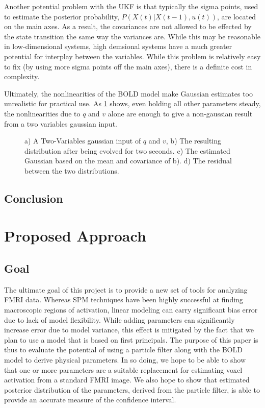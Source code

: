 \documentclass{article}
\begin{document}
Another potential problem with the UKF is that typically the sigma points,
used to estimate the posterior probability, $P(X(t) | X(t-1), u(t))$, are
located on the main axes. As a result, the covariances are not allowed to 
be effected by the state transition the same way the variances are. While
this may be reasonable in low-dimensional systems, high demsional systems
have a much greater potential for interplay between the variables. While
this problem is relatively easy to fix (by using more sigma points off
the main axes), there is a definite cost in complexity.

Ultimately, the nonlinearities of the BOLD model make Gaussian estimates
too unrealistic for practical use. As \ref{fig:Transformation} shows, even 
holding all other parameters steady, the nonlinearities due to $q$ and $v$
alone are enough to give a non-gaussian result from a two variables 
gaussian input. 

\begin{figure}

\label{fig:Transformation}
\caption{a) A Two-Variables gaussian input of $q$ and $v$, b) The 
resulting distribution after being evolved for two seconds. c) The
estimated Gaussian based on the mean and covariance of b). d) The
residual between the two distributions.}
\end{figure}

\subsection{Conclusion}

\section{Proposed Approach}
\subsection{Goal}
The ultimate goal of this project is to provide a new set of tools
for analyzing FMRI data. Whereas SPM techniques have been highly 
successful at finding macroscopic regions of activation, linear 
modeling can carry significant bias error due to lack of model
flexibility. While adding parameters can significantly increase
error due to model variance, this effect is mitigated by the fact
that we plan to use a model that is based on first principals. The
purpose of this paper is thus to evaluate the potential of using
a particle filter along with the BOLD model to derive physical 
parameters. In so doing, we hope to be able to show that one or more
parameters are a suitable replacement for estimating voxel 
activation from a standard FMRI image. We also hope to show that 
estimated posterior distribution of the parameters, derived from
the particle filter, is able to provide an accurate measure of the
confidence interval.
\end{document}
